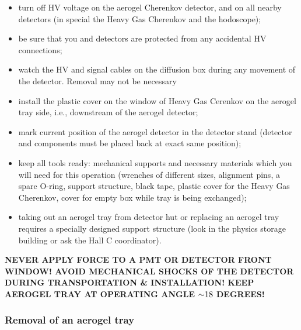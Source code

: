 \begin{itemize}
  \item turn off HV voltage on the aerogel Cherenkov detector, and on
    all nearby detectors (in special the Heavy Gas Cherenkov and the
    hodoscope);
  \item be sure that you and detectors are protected from any
    accidental HV connections;
  \item watch the HV and signal cables on the diffusion box during any
    movement of the detector. Removal may not be necessary
  \item install the plastic cover on the window of Heavy Gas Cerenkov on the
    aerogel tray side, i.e., downstream of the aerogel detector;
  \item mark current position of the aerogel detector in the detector
    stand (detector and components must be placed back at exact same
    position);
  \item keep all tools ready: mechanical supports and necessary
    materials which you will need for this operation (wrenches of
    different sizes, alignment pins, a spare O-ring, support
    structure, black tape, plastic cover for the Heavy Gas Cherenkov,
    cover for empty box while tray is being exchanged);
  \item taking out an aerogel tray from detector hut or replacing an
    aerogel tray requires a specially designed support structure (look
    in the physics storage building or ask the Hall C coordinator).
    \end{itemize}

\textbf{NEVER APPLY FORCE TO A PMT OR DETECTOR
  FRONT WINDOW!  AVOID MECHANICAL SHOCKS OF THE DETECTOR DURING
  TRANSPORTATION \& INSTALLATION!  KEEP AEROGEL TRAY AT OPERATING ANGLE
  $\mathord{\sim} 18$ DEGREES!}

\subsubsection*{Removal of an aerogel tray}

